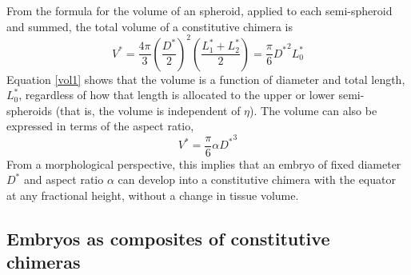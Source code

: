 \documentclass[10pt,a4paper]{article}
\begin{document}
From the formula for the volume of an spheroid, applied to each semi-spheroid and summed, the total volume of a constitutive chimera is
\begin{equation}\label{vol1}
	V^* = \frac{4 \pi}{3} \left({\frac{D^*}{2}}\right)^2 \left(\frac{L_1^*+L_2^*}{2}\right) = \frac{\pi}{6} {D^*}^2 L_0^*
\end{equation} 
Equation \ref{vol1} shows that the volume is a function of diameter and total length, $L_0^*$, regardless of how that length is allocated to the upper or lower semi-spheroids (that is, the volume is independent of $\eta$).
The volume can also be expressed in terms of the aspect ratio,
\begin{equation}\label{vol2}
	V^* = \frac{\pi}{6} \alpha {D^*}^3
\end{equation} 
From a morphological perspective, this implies that an embryo of fixed diameter $D^*$ and aspect ratio $\alpha$ can develop into a constitutive chimera with the equator at any fractional height, without a change in tissue volume. 

\subsection{Embryos as composites of constitutive chimeras}
\end{document}
